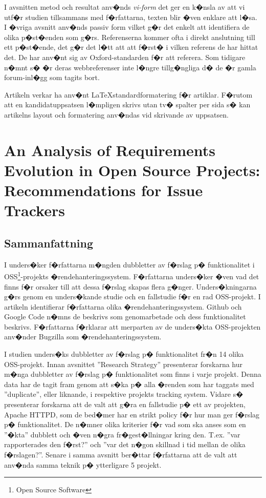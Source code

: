 \documentclass[11pt, oneside]{article}   	%
\begin{document}
I avsnitten metod och resultat anv�nds \emph{vi-form} det ger en k�nsla av att vi utf�r studien tillsammans med f�rfattarna, texten blir �ven enklare att l�sa. I �vriga avsnitt anv�nds passiv form vilket g�r det enkelt att identifiera de olika p�st�enden som g�rs. Referenserna kommer ofta i direkt anslutning till ett p�st�ende, det g�r det l�tt att att f�rst� i vilken referens de har hittat det. De har anv�nt sig av Oxford-standarden f�r att referera. Som tidigare n�mnt s� �r deras webbreferenser inte l�ngre tillg�ngliga d� de �r gamla forum-inl�gg som tagits bort.

Artikeln verkar ha anv�nt \LaTeX standardformatering f�r artiklar. F�rutom att en kandidatuppsatsen l�mpligen skrivs utan tv� spalter per sida s� kan artikelns layout och formatering anv�ndas vid skrivande av uppsatsen.


\newpage
\section{An Analysis of Requirements Evolution in Open Source Projects: Recommendations for Issue Trackers}
\subsection{Sammanfattning}
I \cite{Heck2013} unders�ker f�rfattarna m�ngden dubbletter av f�rslag p� funktionalitet i OSS\footnote{Open Source Software}-projekts �rendehanteringssystem. F�rfattarna unders�ker �ven vad det finns f�r orsaker till att dessa f�rslag skapas flera g�nger. Unders�kningarna g�rs genom en unders�kande studie och en fallstudie f�r en rad OSS-projekt. I artikeln identifierar f�rfattarna olika �rendehanteringssystem. Github och Google Code n�mns de beskrivs som genomarbetade och dess funktionalitet beskrivs. F�rfattarna f�rklarar att merparten av de unders�kta OSS-projekten anv�nder Bugzilla som �rendehanteringssystem.

I studien unders�ks dubbletter av f�rslag p� funktionalitet fr�n 14 olika OSS-projekt. Innan avsnittet ''Research Strategy'' presenterar forskarna hur m�nga dubbletter av f�rslag p� funktionalitet som finns i varje projekt. Denna data har de tagit fram genom att s�ka p� alla �renden som har taggats med ''duplicate'', eller liknande, i respektive projekts tracking system. Vidare s� presenterar forskarna att de valt att g�ra en fallstudie p� ett av projekten, Apache HTTPD, som de bed�mer har en strikt policy f�r hur man ger f�rslag p� funktionalitet. De n�mner olika kriterier f�r vad som ska anses som en ''�kta'' dubblett och �ven n�gra fr�gest�llningar kring den. T.ex. ''var rapporterades den f�rst?'' och ''var det n�gon skillnad i tid mellan de olika f�rslagen?''.  Senare i samma avsnitt ber�ttar f�rfattarna att de valt att anv�nda samma teknik p� ytterligare 5 projekt.
\end{document}
